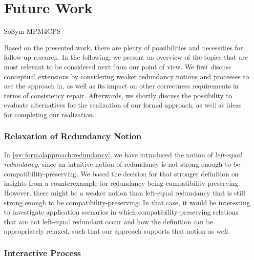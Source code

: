 \chapter{Future Work
}
\label{chap:futurework}

\begin{copiedFrom}{SoSym MPM4CPS}

Based on the presented work, there are plenty of possibilities and necessities for follow-up research.
In the following, we present an overview of the topics that are most relevant to be considered next from our point of view.
We first discuss conceptual extensions by considering weaker redundancy notions and processes to use the approach in, as well as its impact on other correctness requirements in terms of consistency repair.
Afterwards, we shortly discuss the possibility to evaluate alternatives for the realization of our formal approach, as well as ideas for completing our realization.

\subsection{Relaxation of Redundancy Notion}
In \autoref{sec:formalapproach:redundancy}, we have introduced the notion of \emph{left-equal redundancy}, since an intuitive notion of redundancy is not strong enough to be compatibility-preserving.
We based the decision for that stronger definition on insights from a counterexample for redundancy being compatibility-preserving.
However, there might be a weaker notion than left-equal redundancy that is still strong enough to be compatibility-preserving.
In that case, it would be interesting to investigate application scenarios in which compatibility-preserving relations that are not left-equal redundant occur and how the definition can be appropriately relaxed, such that our approach supports that notion as well.

\subsection{Interactive Process}
\label{sec:futurework:compatibilityprocess}


\end{copiedFrom}
